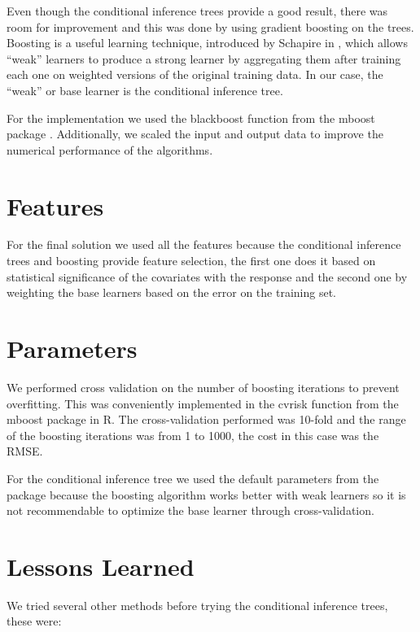 \documentclass[a4paper, 11pt]{article}
\begin{document}
Even though the conditional inference trees provide a good result, there was room for improvement and this was done by using gradient boosting on the trees. Boosting is a useful learning technique, introduced by Schapire in \cite{Schapire:1990:SWL:83637.83645}, which allows ``weak'' learners to produce a strong learner by aggregating them after training each one on weighted versions of the original training data. In our case, the ``weak'' or base learner is the conditional inference tree.

For the implementation we used the blackboost function from the mboost package \cite{Buehlmann:2008:StatSci}. Additionally, we scaled the input and output data to improve the numerical performance of the algorithms.

\section{Features}
For the final solution we used all the features because the conditional inference trees and boosting provide feature selection, the first one does it based on statistical significance of the covariates with the response and the second one by weighting the base learners based on the error on the training set.

\section{Parameters}
We performed cross validation on the number of boosting iterations to prevent overfitting. This was conveniently implemented in the cvrisk function from the mboost package in R. The cross-validation performed was 10-fold and the range of the boosting iterations was from 1 to 1000, the cost in this case was the RMSE. 

For the conditional inference tree we used the default parameters from the package because the boosting algorithm works better with weak learners \cite{Freund+Schapire:1996} so it is not recommendable to optimize the base learner through cross-validation.

\section{Lessons Learned}
We tried several other methods before trying the conditional inference trees, these were:
\end{document}
